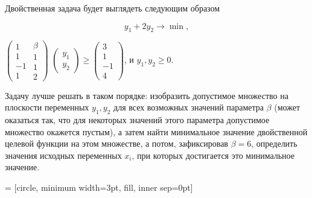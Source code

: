 \begin{problem}
\begin{sol}
Двойственная задача будет выглядеть следующим образом

\[y_{1} +2y_{2} \to \min ,\]

$\left(\begin{array}{c} {1} \\ {1} \\ {-1} \\ {1} \end{array}\begin{array}{c} {\beta } \\ {1} \\ {1} \\ {2} \end{array}\right)$
$\left(\begin{array}{c} {y_{1} } \\ {y_{2} } \end{array}\right)\ge \left(\begin{array}{c} {3} \\ {1} \\ {-1} \\ {4} \end{array}\right)$, и $y_{1} , y_{2} \ge 0$.

Задачу лучше решать в таком порядке: изобразить допустимое множество на плоскости переменных $y_{1} ,y_{2} $ для всех возможных значений параметра $\beta $ (может оказаться так, что для некоторых значений этого параметра допустимое множество окажется пустым), а затем найти минимальное значение двойственной целевой функции на этом множестве, а потом, зафиксировав $\beta =6$, определить значения исходных переменных $x_{i} $, при которых достигается это минимальное значение.


 = [circle, minimum width=3pt, fill, inner sep=0pt]
\end{sol}
\end{problem}
